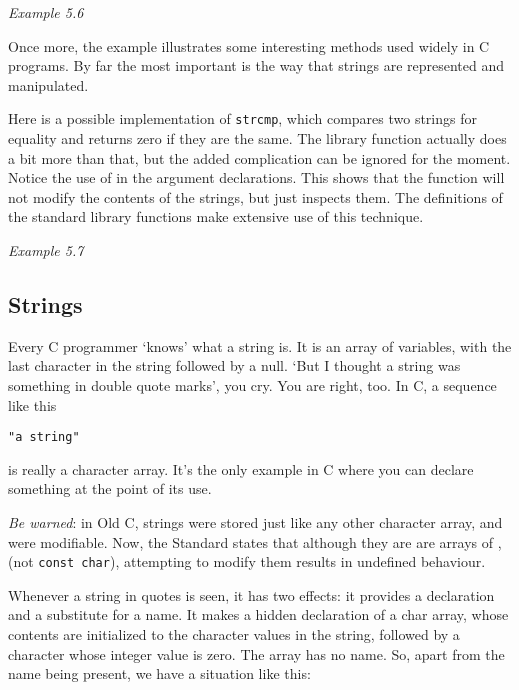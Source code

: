   \begin{center}\textit{Example 5.6}\end{center}


  Once more, the example illustrates some interesting methods used widely
   in C programs. By far the most important is the way that strings are
   represented and manipulated.


  Here is a possible implementation of \texttt{strcmp}, which
   compares two strings for equality and returns zero if they are the same.
   The library function actually does a bit more than that, but the added
   complication can be ignored for the moment. Notice the use of
   \const{} in the argument declarations. This shows that the
   function will not modify the contents of the strings, but just inspects
   them. The definitions of the standard library functions make extensive
   use of this technique.


  \begin{center}\textit{Example 5.7}\end{center}


  \subsection{Strings}
   

   Every C programmer `knows' what a string is. It is an array of
    \kchar{} variables, with the last character in the string
    followed by a null. `But I thought a string was something in double
    quote marks', you cry. You are right, too. In C, a sequence like
    this


   \begin{Verbatim}
"a string"
\end{Verbatim}

   is really a character array. It's the only example in C where you can
    declare something at the point of its use.


   \textit{Be warned}: in Old C, strings were stored just like any other
    character array, and were modifiable. Now, the Standard states that
    although they are are arrays of \kchar, (not \texttt{const
    char}), attempting to modify them results in undefined
    behaviour.


   Whenever a string in quotes is seen, it has two effects: it provides
    a declaration and a substitute for a name. It makes a hidden declaration
    of a char array, whose contents are initialized to the character values
    in the string, followed by a character whose integer value is zero. The
    array has no name. So, apart from the name being present, we have
    a situation like this:


